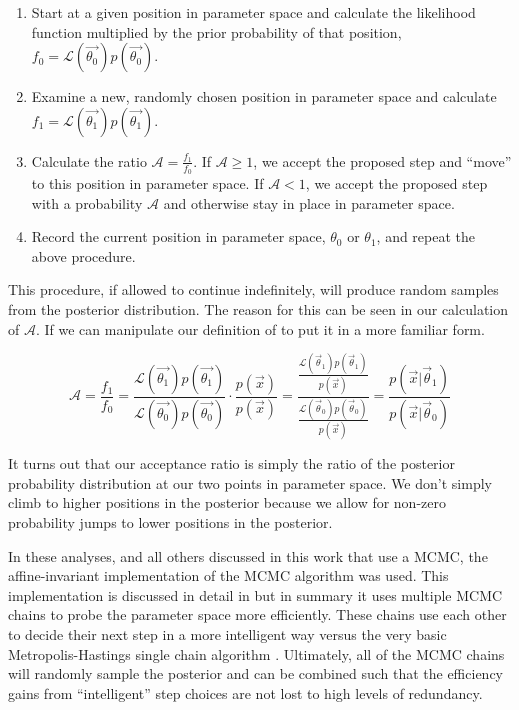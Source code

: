 \begin{enumerate}
        \item Start at a given position in parameter space and calculate the likelihood function multiplied by the prior probability of that position, $f_0 = \mathcal{L}(\vec{\theta_0}) p(\vec{\theta_0})$.  
        \item Examine a new, randomly chosen position in parameter space and calculate $f_1 = \mathcal{L}(\vec{\theta_1}) p(\vec{\theta_1})$.
        \item Calculate the ratio $\mathcal{A} = \frac{f_1}{f_0}$.  If $\mathcal{A} \geq 1$, we accept the proposed step and ``move'' to this position in parameter space.  If $\mathcal{A} < 1$, we accept the proposed step with a probability $\mathcal{A}$ and otherwise stay in place in parameter space.  
        \item Record the current position in parameter space, $\theta_0$ or $\theta_1$, and repeat the above procedure.
\end{enumerate}

This procedure, if allowed to continue indefinitely, will produce random samples from the posterior distribution.  The reason for this can be seen in our calculation of $\mathcal{A}$.  If we can manipulate our definition of to put it in a more familiar form.

\begin{equation}
        \mathcal{A} = \frac{f_1}{f_0} = \frac{\mathcal{L}(\vec{\theta_1}) p(\vec{\theta_1})}{\mathcal{L}(\vec{\theta_0}) p(\vec{\theta_0})} \cdot \frac{p(\vec{x})}{p(\vec{x})} = \frac{\frac{\mathcal{L}(\vec{\theta}_1) p(\vec{\theta}_1)}{p(\vec{x})}}{\frac{\mathcal{L}(\vec{\theta}_0) p(\vec{\theta}_0)}{p(\vec{x})}} = \frac{p(\vec{x}|\vec{\theta}_1)}{p(\vec{x}|\vec{\theta}_0)}
\end{equation}

It turns out that our acceptance ratio is simply the ratio of the posterior probability distribution at our two points in parameter space.  We don't simply climb to higher positions in the posterior because we allow for non-zero probability jumps to lower positions in the posterior.

In these analyses, and all others discussed in this work that use a MCMC, the affine-invariant implementation of the MCMC algorithm was used.  This implementation is discussed in detail in  but in summary it uses multiple MCMC chains to probe the parameter space more efficiently.  These chains use each other to decide their next step in a more intelligent way versus the very basic Metropolis-Hastings single chain algorithm \cite{chib1995understanding}.  Ultimately, all of the MCMC chains will randomly sample the posterior and can be combined such that the efficiency gains from ``intelligent'' step choices are not lost to high levels of redundancy.

